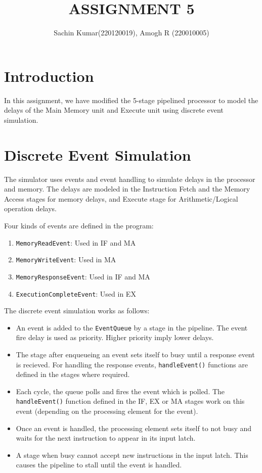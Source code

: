 \documentclass[12pt,a4paper]{article}
\title{\textbf{ASSIGNMENT 5}}
\author{Sachin Kumar(220120019), Amogh R (220010005)}
\date{}
\begin{document}
\maketitle

\section{Introduction}\label{sec:intro}
In this assignment, we have modified the 5-stage pipelined processor to model the delays of the Main Memory unit and Execute unit using discrete event simulation. 

\section{Discrete Event Simulation}
The simulator uses events and event handling to simulate delays in the processor and memory.
The delays are modeled in the Instruction Fetch and the Memory Access stages for memory delays, and Execute stage for Arithmetic/Logical operation delays.

Four kinds of events are defined in the program:
\begin{enumerate}
	\item \texttt{MemoryReadEvent}: Used in IF and MA
	\item \texttt{MemoryWriteEvent}: Used in MA
	\item \texttt{MemoryResponseEvent}: Used in IF and MA
	\item \texttt{ExecutionCompleteEvent}: Used in EX
\end{enumerate}
The discrete event simulation works as follows:
\begin{itemize}
	\item An event is added to the \texttt{EventQueue} by a stage in the pipeline. The event fire delay is used as priority. Higher priority imply lower delays.
	
	\item The stage after enqueueing an event sets itself to busy until a response event is recieved. For handling the response events, \texttt{handleEvent()} functions are defined in the stages where required.
	
	\item Each cycle, the queue polls and fires the event which is polled. The \texttt{handleEvent()} function defined in the IF, EX or MA stages work on this event (depending on the processing element for the event).
	
	\item Once an event is handled, the processing element sets itself to not busy and waits for the next instruction to appear in its input latch.
	
	\item A stage when busy cannot accept new instructions in the input latch. This causes the pipeline to stall until the event is handled.
\end{itemize}
\end{document}
